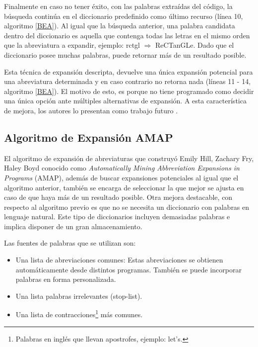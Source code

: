 Finalmente en caso no tener éxito, con las palabras extraídas del código, la búsqueda continúa en el diccionario predefinido como último recurso (línea 10, algoritmo \ref{BEA}). Al igual que la búsqueda anterior, una palabra candidata dentro del diccionario es aquella que contenga todas las letras en el mismo orden que la abreviatura a expandir, ejemplo: \mbox{\textsf{rctgl}} $\Rightarrow$ R\textsf{e}CT\textsf{an}GL\textsf{e}. Dado que el diccionario posee muchas palabras, puede retornar más de un resultado posible.

Esta técnica de expansión descripta, devuelve una única expansión potencial para una abreviatura determinada y en caso contrario no retorna nada (líneas 11 - 14, algoritmo \ref{BEA}). El motivo de esto, es porque no tiene programado como decidir una única opción ante múltiples alternativas de expansión. A esta característica de mejora, los autores lo presentan como trabajo futuro \cite{LFBEX07,EZH08}.

\subsection{Algoritmo de Expansión AMAP}
\label{sec:algAmap}

El algoritmo de expansión de abreviaturas que construyó Emily Hill, Zachary Fry, Haley Boyd \cite{EZH08} conocido como \textit{Automatically Mining Abbreviation Expansions in Programs} (AMAP), además de buscar expansiones potenciales al igual que el algoritmo anterior, también se encarga de seleccionar la que mejor se ajusta en caso de que haya más de un resultado posible. Otra mejora destacable, con respecto al algoritmo previo es que no se necesita un diccionario con palabras en lenguaje natural. Este tipo de diccionarios incluyen demasiadas palabras e implica disponer de un gran almacenamiento. 

Las fuentes de palabras que se utilizan son:
\begin{itemize}
\itemsep0em%
\item Una lista de abreviaciones comunes: Estas abreviaciones se obtienen automáticamente desde distintos programas. También se puede incorporar palabras en forma personalizada.
\item Una lista palabras irrelevantes (stop-list).
\item Una lista de contracciones\footnote[1]{Palabras en inglés que llevan apostrofes, ejemplo: let's.} más comunes.
\end{itemize}

